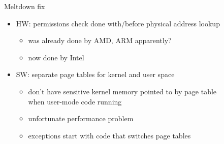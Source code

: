 
\begin{frame}{Meltdown fix}
\begin{itemize}
\item HW: permissions check done with/before physical address lookup
    \begin{itemize}
    \item was already done by AMD, ARM apparently?
    \item now done by Intel
    \end{itemize}
\item SW: separate page tables for kernel and user space
    \begin{itemize}
    \item don't have sensitive kernel memory pointed to by page table \\
        when user-mode code running
    \item unfortunate performance problem
    \item exceptions start with code that switches page tables
    \end{itemize}
\end{itemize}
\end{frame}
